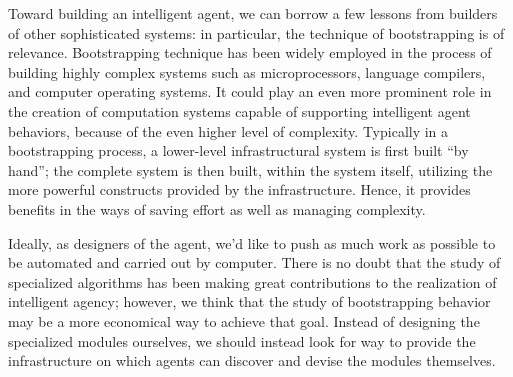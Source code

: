 \documentclass{llncs}
\begin{document}
  
Toward building an intelligent agent, we can borrow a few lessons from
builders of other sophisticated systems: in particular, the technique of
bootstrapping is of relevance.  Bootstrapping technique has been widely
employed in the process of building highly complex systems such as
microprocessors, language compilers, and computer operating systems.  It
could play an even more prominent role in the creation of computation
systems capable of supporting intelligent agent behaviors, because of the
even higher level of complexity.  Typically in a bootstrapping process, a
lower-level infrastructural system is first built ``by hand''; the complete
system is then built, within the system itself, utilizing the more powerful
constructs provided by the infrastructure.  Hence, it provides benefits in
the ways of saving effort as well as managing complexity.

Ideally, as designers of the agent, we'd like to push as much work as
possible to be automated and carried out by computer.  There is no doubt
that the study of specialized algorithms has been making great
contributions to the realization of intelligent agency; however, we think
that the study of bootstrapping behavior may be a more economical way to
achieve that goal.  Instead of designing the specialized modules ourselves,
we should instead look for way to provide the infrastructure on which
agents can discover and devise the modules themselves.

\end{document}
